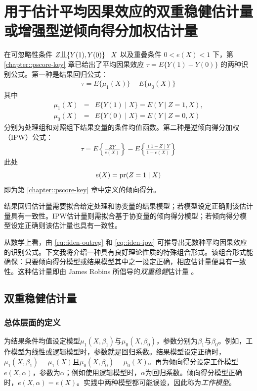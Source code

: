 
\chapter{用于估计平均因果效应的双重稳健估计量或增强型逆倾向得分加权估计量}\label{chapter::doubly-robust}

在可忽略性条件 $Z\ind \{ Y(1), Y(0) \} \mid X$ 以及重叠条件 $0< e(X) < 1$ 下，第 \ref{chapter::pscore-key} 章已给出了平均因果效应 $\tau = E\{ Y(1) - Y(0)  \}$ 的两种识别公式。第一种是结果回归公式：
\begin{eqnarray}
\tau  =  E\{ \mu_1(X) \} - E\{ \mu_0(X) \} \label{eq::iden-outreg}
\end{eqnarray}
其中
\begin{eqnarray*}
\mu_1(X)  &=& E\{  Y(1) \mid X \} = E(Y\mid Z=1, X),\\ 
\mu_0(X) &=& E\{  Y(0) \mid X \} = E(Y\mid Z=0, X)
\end{eqnarray*}
分别为处理组和对照组下结果变量的条件均值函数。第二种是逆倾向得分加权（IPW）公式：
\begin{eqnarray}
\tau = E\left\{  \frac{ZY}{e(X)}   \right\} - E\left\{  \frac{(1-Z)Y}{1-e(X)}   \right\} \label{eq::iden-ipw}
\end{eqnarray}
此处
$$
e(X) = \textup{pr}(Z=1\mid X)
$$
即为第 \ref{chapter::pscore-key} 章中定义的倾向得分。  


结果回归估计量需要拟合给定处理和协变量的结果模型；若模型设定正确则该估计量具有一致性。IPW估计量则需拟合基于协变量的倾向得分模型；若倾向得分模型设定正确则该估计量也具有一致性。


从数学上看，由 \eqref{eq::iden-outreg} 和 \eqref{eq::iden-ipw} 可推导出无数种平均因果效应的识别公式。下文我将介绍一种具有良好理论性质的特殊组合形式。该组合形式能确保：只要倾向得分模型或结果模型其中之一设定正确，相应估计量便具有一致性。这种估计量即由 James Robins 所倡导的{\it 双重稳健}估计量 \citep{scharfstein1999adjusting, bang2005doubly}。 



\section{双重稳健估计量}

\subsection{总体层面的定义}


为结果条件均值设定模型$\mu_1(X, \beta_1)$与$\mu_0(X, \beta_0)$，参数分别为$\beta_1$与$\beta_0$。例如，工作模型为线性或逻辑模型时，参数就是回归系数。结果模型设定正确时，$\mu_1(X, \beta_1) = \mu_1(X)$且$   \mu_0(X, \beta_0) = \mu_0(X)$。再为倾向得分设定工作模型$e(X, \alpha)$，参数为$\alpha$；例如使用逻辑模型时，$\alpha$为回归系数。倾向得分模型正确时，$e(X,\alpha) = e(X)$。实践中两种模型都可能误设，因此称为{\it 工作模型}。 

